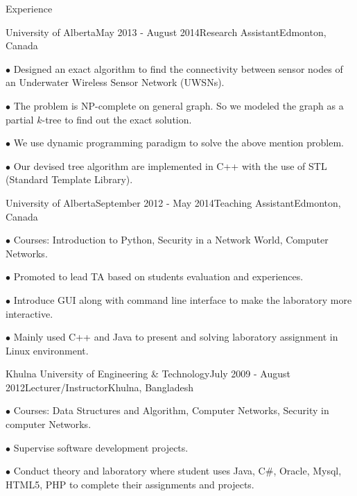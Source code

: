 \documentclass{resume} %
\begin{document}
\begin{rSection}{Experience}

\begin{rSubsection}{University of Alberta}{May 2013 - August 2014}{Research Assistant}{Edmonton, Canada}
\item[$\bullet$] Designed an exact algorithm to find the connectivity between sensor nodes of an Underwater Wireless Sensor Network (UWSNs).
\item[$\bullet$] The problem is NP-complete on general graph. So we modeled the graph as a partial $k$-tree to find out the exact solution.
\item[$\bullet$] We use dynamic programming paradigm to solve the above mention problem.
\item[$\bullet$] Our devised tree algorithm are implemented in C++ with the use of STL (Standard Template Library).
\end{rSubsection}



\begin{rSubsection}{University of Alberta}{September 2012 - May 2014}{Teaching Assistant}{Edmonton, Canada}
\item[$\bullet$] Courses: Introduction to Python, Security in a Network World, Computer Networks.
\item[$\bullet$] Promoted to lead TA based on students evaluation and experiences.
\item[$\bullet$] Introduce GUI along with command line interface to make the laboratory more interactive.
\item[$\bullet$] Mainly used C++ and Java to present and solving laboratory assignment in Linux environment. 
\end{rSubsection}
\begin{rSubsection}{Khulna University of Engineering \& Technology}{July 2009 - August 2012}{Lecturer/Instructor}{Khulna, Bangladesh}
\item[$\bullet$] Courses: Data Structures and Algorithm, Computer Networks, Security in computer Networks.
\item[$\bullet$] Supervise software development projects.
\item[$\bullet$] Conduct theory and laboratory where student uses Java, C$\#$, Oracle, Mysql, HTML5, PHP to complete their assignments and projects. 
\end{rSubsection}
\end{rSection}
\end{document}
